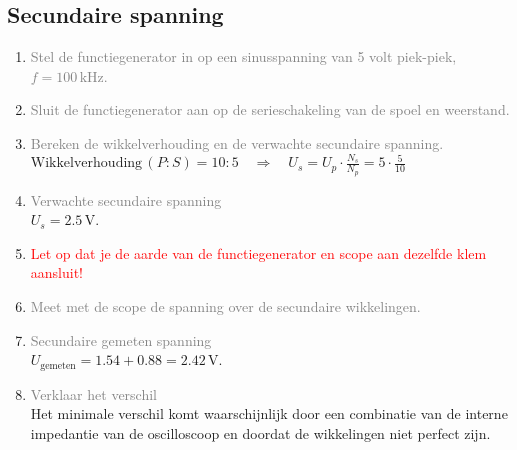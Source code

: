 \subsection{Secundaire spanning}
\begin{enumerate}
    \item \textcolor{gray}{Stel de functiegenerator in op een sinusspanning van 5 volt piek-piek, \( f = 100 \, \text{kHz} \).}
    \item \textcolor{gray}{Sluit de functiegenerator aan op de serieschakeling van de spoel en weerstand.}
    \item \textcolor{gray}{Bereken de wikkelverhouding en de verwachte secundaire spanning.}
    \\ \(\text{Wikkelverhouding} \, (P:S) = 10:5 \quad \Rightarrow \quad U_s = U_p \cdot \frac{N_s}{N_p} = 5 \cdot \frac{5}{10}\)
    \item \textcolor{gray}{Verwachte secundaire spanning}
    \\ \( U_s = 2.5 \, \text{V} \).
    \item \textcolor{red}{Let op dat je de aarde van de functiegenerator en scope aan dezelfde klem aansluit!}
    \item \textcolor{gray}{Meet met de scope de spanning over de secundaire wikkelingen.}
    \item \textcolor{gray}{Secundaire gemeten spanning}
    \\ \( U_{\text{gemeten}} = 1.54 + 0.88 = 2.42 \, \text{V} \).
    \item \textcolor{gray}{Verklaar het verschil}
    \\ Het minimale verschil komt waarschijnlijk door een combinatie van de interne impedantie van de oscilloscoop en doordat de wikkelingen niet perfect zijn.
\end{enumerate}
